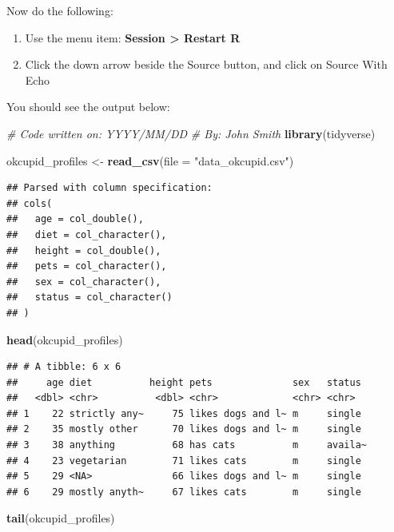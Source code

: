 \documentclass[
]{krantz}
\makeatletter
\newenvironment{Shaded}{\begin{snugshade}}{\end{snugshade}}
\newcommand{\CommentTok}[1]{\textcolor[rgb]{0.37,0.37,0.37}{\textit{#1}}}
\newcommand{\DataTypeTok}[1]{\textcolor[rgb]{0.27,0.27,0.27}{#1}}
\newcommand{\KeywordTok}[1]{\textcolor[rgb]{0.27,0.27,0.27}{\textbf{#1}}}
\newcommand{\NormalTok}[1]{#1}
\newcommand{\StringTok}[1]{\textcolor[rgb]{0.5,0.5,0.5}{#1}}
\providecommand{\tightlist}{%
  \setlength{\itemsep}{0pt}\setlength{\parskip}{0pt}}
\newenvironment{kframe}{%
\medskip{}
\setlength{\fboxsep}{.8em}
 \def\at@end@of@kframe{}%
 \ifinner\ifhmode%
  \def\at@end@of@kframe{\end{minipage}}%
  \begin{minipage}{\columnwidth}%
 \fi\fi%
 \def\FrameCommand##1{\hskip\@totalleftmargin \hskip-\fboxsep
 \colorbox{shadecolor}{##1}\hskip-\fboxsep
     \hskip-\linewidth \hskip-\@totalleftmargin \hskip\columnwidth}%
 \MakeFramed {\advance\hsize-\width
   \@totalleftmargin\z@ \linewidth\hsize
   \@setminipage}}%
 {\par\unskip\endMakeFramed%
 \at@end@of@kframe}
\renewenvironment{Shaded}{\begin{kframe}}{\end{kframe}}
\makeatother
\begin{document}
Now do the following:

\begin{enumerate}
\def\labelenumi{\arabic{enumi}.}
\tightlist
\item
  Use the menu item: \textbf{Session \textgreater{} Restart R}
\item
  Click the down arrow beside the Source button, and click on Source With Echo
\end{enumerate}

You should see the output below:

\begin{Shaded}
\begin{Highlighting}[]
\CommentTok{# Code written on: YYYY/MM/DD }
\CommentTok{# By: John Smith}
\KeywordTok{library}\NormalTok{(tidyverse)}

\NormalTok{okcupid_profiles <-}\StringTok{ }\KeywordTok{read_csv}\NormalTok{(}\DataTypeTok{file =} \StringTok{"data_okcupid.csv"}\NormalTok{)}
\end{Highlighting}
\end{Shaded}

\begin{verbatim}
## Parsed with column specification:
## cols(
##   age = col_double(),
##   diet = col_character(),
##   height = col_double(),
##   pets = col_character(),
##   sex = col_character(),
##   status = col_character()
## )
\end{verbatim}

\begin{Shaded}
\begin{Highlighting}[]
\KeywordTok{head}\NormalTok{(okcupid_profiles)}
\end{Highlighting}
\end{Shaded}

\begin{verbatim}
## # A tibble: 6 x 6
##     age diet          height pets              sex   status 
##   <dbl> <chr>          <dbl> <chr>             <chr> <chr>  
## 1    22 strictly any~     75 likes dogs and l~ m     single 
## 2    35 mostly other      70 likes dogs and l~ m     single 
## 3    38 anything          68 has cats          m     availa~
## 4    23 vegetarian        71 likes cats        m     single 
## 5    29 <NA>              66 likes dogs and l~ m     single 
## 6    29 mostly anyth~     67 likes cats        m     single
\end{verbatim}

\begin{Shaded}
\begin{Highlighting}[]
\KeywordTok{tail}\NormalTok{(okcupid_profiles)}
\end{Highlighting}
\end{Shaded}
\end{document}
